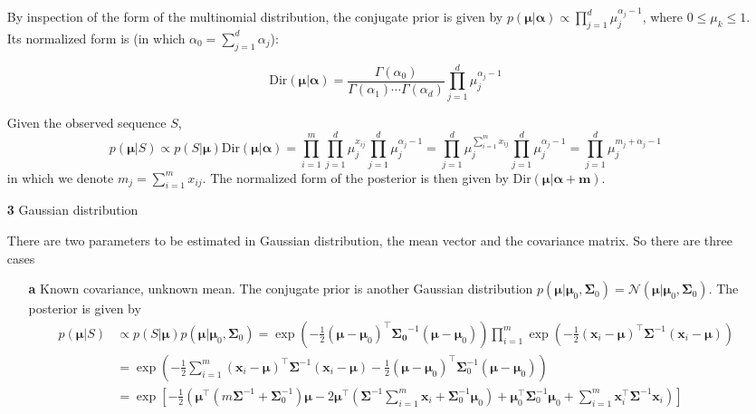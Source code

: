 \documentclass{article}
\begin{document}
\begin{itemize}
	By inspection of the form of the multinomial distribution, the conjugate prior is given by $p(\bm{\mu}|\bm{\alpha})\propto \prod_{j=1}^d \mu_j^{\alpha_j-1}$, where $0\leq\mu_k\leq 1$. Its normalized form is (in which $\alpha_0=\sum_{j=1}^d \alpha_j$):
	
	\begin{equation*}
	\mathrm{Dir} (\bm{\mu}|\bm{\alpha}) = \frac{\Gamma(\alpha_0)}{\Gamma(\alpha_1)\cdots\Gamma(\alpha_d)}  \prod_{j=1}^d \mu_j^{\alpha_j-1}
	\end{equation*}
	
	Given the observed sequence $S$, 
	\begin{equation*}
	p(\bm{\mu}|S) \propto p(S|\bm{\mu}) \mathrm{Dir} (\bm{\mu}|\bm{\alpha}) =\prod_{i=1}^m \prod_{j=1}^d \mu_j^{x_{ij}} \prod_{j=1}^d \mu_j^{\alpha_j-1} = \prod_{j=1}^d \mu_j^{\sum_{i=1}^m x_{ij}} \prod_{j=1}^d \mu_j^{\alpha_j-1} =  \prod_{j=1}^d \mu_j^{m_j+\alpha_j-1}
	\end{equation*}
in which we denote $m_j=\sum_{i=1}^m x_{ij}$. The normalized form of the posterior is then given by $\mathrm{Dir}(\bm{\mu}|\bm{\alpha}+\bm{m})$.
	
	\item [\textbf{3}] Gaussian distribution

	There are two parameters to be estimated in Gaussian distribution, the mean vector and the covariance matrix. So there are three cases
	
	\begin{itemize}
	\item [\textbf{a}] Known covariance, unknown mean.
	The conjugate prior is another Gaussian distribution $p(\bm{\mu}|\bm{\mu}_0, \bm{\Sigma}_0)=\mathcal{N}(\bm{\mu}|\bm{\mu}_0, \bm{\Sigma}_0)$. The posterior is given by
	\begin{equation*}
	\begin{split}
	p(\bm{\mu}|S) &\propto p(S|\bm{\mu})p(\bm{\mu}|\bm{\mu}_0, \bm{\Sigma}_0) =  \exp \left( -\frac{1}{2} (\bm{\mu}-\bm{\mu}_0)^\top \bm{\Sigma_0}^{-1} (\bm{\mu}-\bm{\mu}_0)\right) \prod_{i=1}^m \exp \left( -\frac{1}{2} (\bm{x}_i-\bm{\mu})^\top \bm{\Sigma}^{-1}  (\bm{x}_i-\bm{\mu}) \right) \\
	&= \exp \left( -\frac{1}{2} \sum_{i=1}^m  (\bm{x}_i-\bm{\mu})^\top \bm{\Sigma}^{-1}  (\bm{x}_i-\bm{\mu}) -\frac{1}{2}(\bm{\mu}-\bm{\mu}_0)^\top \bm{\Sigma}_0^{-1} (\bm{\mu}-\bm{\mu}_0) \right) \\
	&= \exp \left[ -\frac{1}{2} \left( \bm{\mu}^\top (m\bm{\Sigma}^{-1} + \bm{\Sigma}_0^{-1}) \bm{\mu} - 2 \bm{\mu}^\top \left(\bm{\Sigma}^{-1} \sum_{i=1}^m \bm{x}_i + \bm{\Sigma}_0^{-1} \bm{\mu}_0\right) + \bm{\mu}_0^\top \bm{\Sigma}_0^{-1} \bm{\mu}_0 + \sum_{i=1}^m \bm{x}_i^\top \bm{\Sigma}^{-1} \bm{x}_i\right) \right]
	\end{split}
	\end{equation*}
	

\end{itemize}
\end{itemize}
\end{document}

